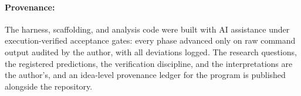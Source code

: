 \paragraph{Provenance:} The harness, scaffolding, and analysis code were built with AI assistance under execution-verified acceptance gates: every phase advanced only on raw command output audited by the author, with all deviations logged. The research questions, the registered predictions, the verification discipline, and the interpretations are the author's, and an idea-level provenance ledger for the program is published alongside the repository.
